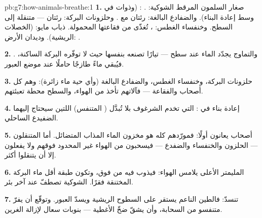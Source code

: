 \begin{solution}{pb:g7:how-animals-breathe:1}
\textbf{1.} صغار السلمون المرقط  الشوكية: .
:  (وذوات  في وسط إعادة البناء). والضفادع
البالغة: رئتان مع . وحلزونات البركة: رئتان --- متنقلة إلى
السطح. وخنفساء الغطس: ، تُغذّى من فقاعتها المحمولة.
 ذباب مايو:  (الخصلات الريشية). وديدان الأرض: .

\textbf{2.} . والتماوج يجدّد الماء عند سطح  --- تيارًا
تصنعه بنفسها حيث لا توفّره البركة الساكنة، فيُبقي ماءً طازجًا حاملًا
 عند موضع العبور.

\textbf{3.} حلزونات البركة، وخنفساء الغطس، والضفادع البالغة (وأي
حية ماء زائرة): وهم كل أصحاب  والفقاعة --- فآلاتهم تأخذ
 من الهواء، والسطح محطة تعبئتهم.

\textbf{4.} إعادة بناء  في :  التي تخدم
الشرغوف بلا  تُبدَّل  ( المتنفس) اللتين سيحتاج
إليهما الضفيدع الساحلي.

\textbf{5.} أصحاب  يعانون أولًا: فمورّدهم كله هو مخزون
الماء المذاب المتضائل. أما المتنقلون --- الحلزون والخنفساء والضفدع
--- فيسحبون من الهواء غير المحدود فوقهم ولا يفعلون إلا أن يتنقلوا
أكثر.

\textbf{6.} المليمتر الأعلى يلامس الهواء: فيذوب  فيه من
فوق، وتكون طبقة  أقل ماء البركة المختنقة فقرًا. 
الشوكية تصطفّ عند آخر بئر.

\textbf{7.}  تنسدّ: فالطين الناعم يستقر على السطوح الريشية
ويسدّ العبور. وتوقّع أن يفرّ متنفسو  من السحابة، وأن يشقّ
ضخّ الأغطية --- بنوبات سعال لإزالة الغرين.


\end{solution}
